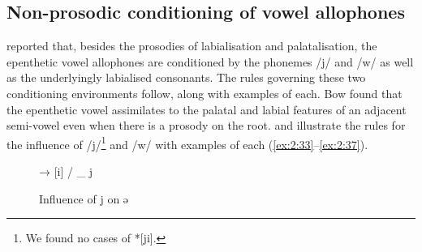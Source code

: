 \begin{table}
\caption{Underlying prosody patterns in two and three syllable words\label{tab:2.11}}
\end{table}
\subsection{ Non-prosodic conditioning of vowel allophones}\label{sec:2.3.3}
\hypertarget{RefHeading1210601525720847}{}
\citet{Bow1997c} reported that, besides the prosodies of labialisation and palatalisation, the epenthetic vowel allophones are conditioned by the phonemes /j/ and /w/ as well as the underlyingly labialised consonants.  The rules governing these two conditioning environments follow, along with examples of each. Bow found that the epenthetic vowel assimilates to the palatal and labial features of an adjacent semi-vowel even when there is a prosody on the root.   and  illustrate the rules for the influence of /j/\footnote{We found no cases of *[ji].} and /w/ with examples of each (\ref{ex:2:33}--\ref{ex:2:37}). 

\begin{figure}
\begin{centering}[ə] → [i] / \_ j\end{centering}
\caption{Influence of j on ə\label{fig:2.4}}
\end{figure}


